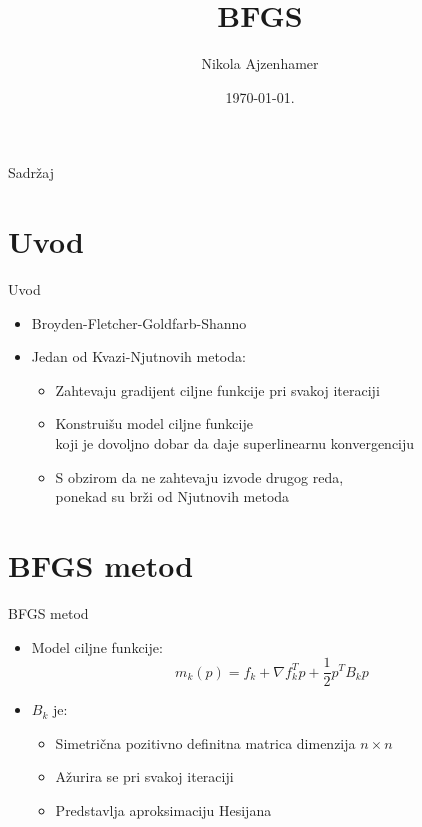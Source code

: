 \documentclass[serbian]{beamer}
\title[BFGS]{BFGS}
\author{Nikola Ajzenhamer}
\institute{Matemati\v cki fakultet, \\ Univerzitet u Beogradu}
\date{\today.}
\begin{document}
\begin{frame}
  	\titlepage
\end{frame}

\begin{frame}{Sadr\v zaj}
  	\tableofcontents
\end{frame}

\section{Uvod}

\begin{frame}{Uvod}

\begin{itemize}
	\item Broyden-Fletcher-Goldfarb-Shanno
	\item Jedan od Kvazi-Njutnovih metoda:
	\begin{itemize}
		\item Zahtevaju gradijent ciljne funkcije pri svakoj iteraciji
		\item Konstrui\v su model ciljne funkcije \\
		koji je dovoljno dobar da daje superlinearnu konvergenciju
		\item S obzirom da ne zahtevaju izvode drugog reda, \\
		ponekad su br\v zi od Njutnovih metoda
	\end{itemize}
\end{itemize}

\end{frame}

\section{BFGS metod}

\begin{frame}{BFGS metod}

\begin{itemize}
	\item Model ciljne funkcije:
	\begin{equation}\label{for:model ciljne funkcije}
		m_k(p) = f_k + \nabla f_k^Tp + \dfrac{1}{2} p^T B_k p
	\end{equation}

	\item $B_k$ je:
	\begin{itemize}
		\item Simetri\v cna pozitivno definitna matrica dimenzija $n \times n$
		\item A\v zurira se pri svakoj iteraciji
		\item Predstavlja aproksimaciju Hesijana
	\end{itemize}
\end{itemize}

\end{frame}
\end{document}
